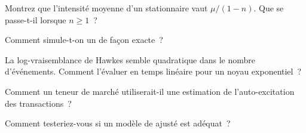 \begin{interviewq}\label{iq:qm:point-processes-and-hawkes-processes:2}
Montrez que l'intensité moyenne d'un  stationnaire vaut $\mu/(1 - n)$. Que se passe-t-il lorsque $n \ge 1$~?
\end{interviewq}

\begin{interviewq}\label{iq:qm:point-processes-and-hawkes-processes:3}
Comment simule-t-on un  de façon exacte~?
\end{interviewq}

\begin{interviewq}\label{iq:qm:point-processes-and-hawkes-processes:4}
La log-vraisemblance de Hawkes semble quadratique dans le nombre d'événements. Comment l'évaluer en temps linéaire pour un
noyau exponentiel~?
\end{interviewq}

\begin{interviewq}\label{iq:qm:point-processes-and-hawkes-processes:5}
Comment un teneur de marché utiliserait-il une estimation de l'auto-excitation des transactions~?
\end{interviewq}

\begin{interviewq}\label{iq:qm:point-processes-and-hawkes-processes:6}
Comment testeriez-vous si un modèle de  ajusté est adéquat~?
\end{interviewq}
